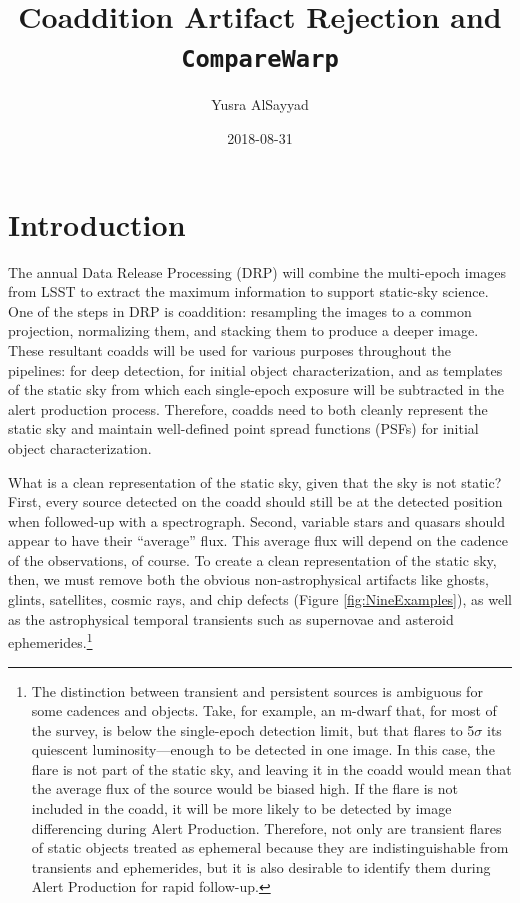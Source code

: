 \documentclass[DM,authoryear,toc]{lsstdoc}
\title{Coaddition Artifact Rejection and \texttt{CompareWarp}}
\author{%
Yusra AlSayyad
}
\date{2018-08-31}
\begin{document}
\maketitle


\section{Introduction}
The annual Data Release Processing (DRP) will combine the multi-epoch images from LSST to extract the maximum information to support static-sky science.
One of the steps in DRP is coaddition:  resampling the images to a common projection,  normalizing them, and stacking them to produce a deeper image.
These resultant coadds will be used for various purposes throughout the pipelines: for deep detection, for initial object characterization, and as templates of the static sky from which each single-epoch exposure will be subtracted in the alert production process.
Therefore, coadds need to both cleanly represent the static sky and  maintain well-defined point spread functions (PSFs) for initial object characterization.

What is a clean representation of the static sky, given that the sky is not static?
First, every source detected on the coadd should still be at the detected position when followed-up with a spectrograph.
Second, variable stars and quasars should appear to have their ``average'' flux.
This average flux will depend on the cadence of the observations, of course.
To create a clean representation of the static sky, then, we must remove both the obvious non-astrophysical artifacts like ghosts, glints, satellites, cosmic rays, and chip defects (Figure \ref{fig:NineExamples}),  as well as the astrophysical temporal transients such as supernovae and asteroid ephemerides.\footnote{The distinction between transient and persistent sources is ambiguous for some cadences and objects.
Take, for example, an m-dwarf that, for most of the survey, is below the single-epoch detection limit, but that flares to 5$\sigma$ its quiescent luminosity---enough to be detected in one image.
In this case, the flare is not part of the static sky, and leaving it in the coadd would mean that the average flux of the source would be biased high.
If the flare is not included in the coadd, it will be more likely to be detected by image differencing during Alert Production.
Therefore, not only are transient flares of static objects treated as ephemeral because they are indistinguishable from transients and ephemerides, but it is also desirable to identify them during Alert Production for rapid follow-up.}
\end{document}
